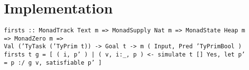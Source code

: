 
\section{Implementation}
\label{sec:implementation}
\lstset{language=Haskell}
\footnotesize\noindent%
\texttt{firsts :: MonadTrack Text m => MonadSupply Nat m => MonadState Heap m => MonadZero m =>}\\
\texttt{Val ('TyTask ('TyPrim t)) -> Goal t -> m ( Input, Pred 'TyPrimBool )}\\
\texttt{firsts t g = [ ( i, p' ) | ( v, i:_, p ) <- simulate t [] Yes, let p' = p :/\: g v, satisfiable p' ]}
\normalsize
